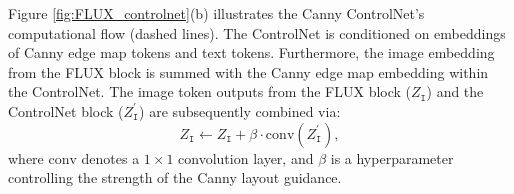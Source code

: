 \documentclass{article}
\begin{document}
Figure \ref{fig:FLUX_controlnet}(b) illustrates the Canny ControlNet's computational flow (dashed lines). The ControlNet is conditioned on embeddings of Canny edge map tokens and text tokens. Furthermore, the image embedding from the FLUX block is summed with the Canny edge map embedding within the ControlNet. The image token outputs from the FLUX block ($Z_{\texttt{I}}$) and the ControlNet block ($Z^{\prime}_{\texttt{I}}$) are subsequently combined via:
\begin{equation}
Z_{\texttt{I}} \gets Z_{\texttt{I}} + \beta \cdot \mathrm{conv}(Z^{\prime}_{\texttt{I}}),
\label{eq:controlnet_add}
\end{equation}
where $\mathrm{conv}$ denotes a $1\times1$ convolution layer, and $\beta$ is a hyperparameter controlling the strength of the Canny layout guidance.



\end{document}

